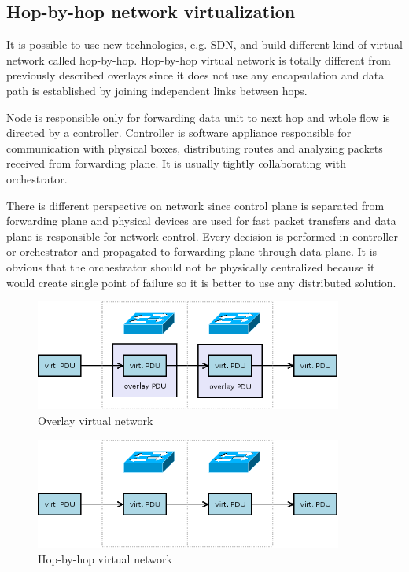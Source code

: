 \subsection{Hop-by-hop network virtualization}
It is possible to use new technologies, e.g. \Ac{SDN}, and build different kind of virtual network called hop-by-hop. Hop-by-hop virtual network is totally different from previously described overlays since it does not use any encapsulation and data path is established by joining independent links between hops.

Node is responsible only for forwarding data unit to next hop and whole flow is directed by a controller. Controller is software appliance responsible for communication with physical boxes, distributing routes and analyzing packets received from forwarding plane. It is usually tightly collaborating with orchestrator.

There is different perspective on network since control plane is separated from forwarding plane and physical devices are used for fast packet transfers and data plane is responsible for network control. Every decision is performed in controller or orchestrator and propagated to forwarding plane through data plane. It is obvious that the orchestrator should not be physically centralized because it would create single point of failure so it is better to use any distributed solution.


\begin{figure}[htb]
	\begin{center}
	\includegraphics[width=0.9\textwidth]{overlay.png}
	\end{center}
	\caption{Overlay virtual network}
	\label{img:overlay}
\end{figure}


\begin{figure}[htb]
	\begin{center}
	\includegraphics[width=0.9\textwidth]{hop-by-hop.png}
	\end{center}
	\caption{Hop-by-hop virtual network}
	\label{img:hop-by-hop}
\end{figure}

